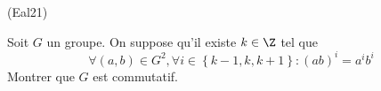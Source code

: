 \begin{tiny}(Eal21)\end{tiny} Soit $G$ un groupe. On suppose qu'il existe $k\in \Z$ tel que
\begin{displaymath}
  \forall(a,b)\in G^2, \forall i \in \left\lbrace k-1, k, k+1\right\rbrace :
  (ab)^i = a^i b^i
\end{displaymath}
Montrer que $G$ est commutatif.